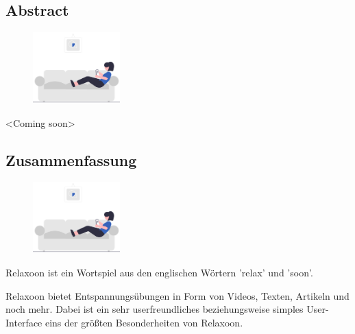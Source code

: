 \begin{spacing}{1}
    \chapter*{Abstract}
\end{spacing}
\begin{figure}
    \begin{center}
      \includegraphics[width=0.3\textwidth]{pics/undraw_Relaxing_at_home_re_mror.png}
    \end{center}
\end{figure}
<Coming soon>
\newpage
\begin{spacing}{1}
    \chapter*{Zusammenfassung}
\end{spacing}
\begin{figure}
    \begin{center}
      \includegraphics[width=0.3\textwidth]{pics/undraw_Relaxing_at_home_re_mror.png}
    \end{center}
\end{figure}
Relaxoon ist ein Wortspiel aus den englischen Wörtern 'relax' und 'soon'. 

Relaxoon bietet Entspannungsübungen in Form von Videos, Texten, Artikeln und noch mehr. 
Dabei ist ein sehr userfreundliches beziehungsweise simples User-Interface eins der größten Besonderheiten von Relaxoon.

